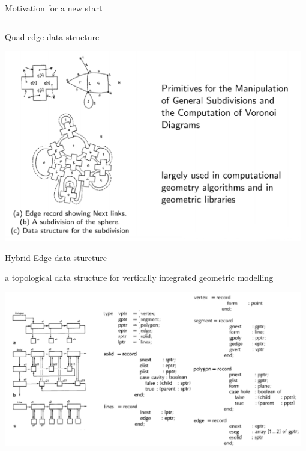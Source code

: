     \begin{frame}[plain]{Motivation for a new start}
    \protect\hypertarget{motivation-for-a-new-start}{}
    
    \begin{columns}[T]
    \begin{column}{0.48\textwidth}
    {\small Quad-edge data structure \cite{Guibas1985}}
    
    \includegraphics[width=0.98\textwidth]{figs/Guibas1985_quad_edge.png}~
    
    
    {\small Hybrid Edge data sturcture \cite{Kalay1989}}
    
    { \scriptsize
    a topological data structure for vertically integrated geometric
    modelling
    
    }
    
    \includegraphics[width=0.98\textwidth]{figs/Kalay1989_hybrid_edge.png}~
    

\end{column}
\end{columns}
\end{frame}
